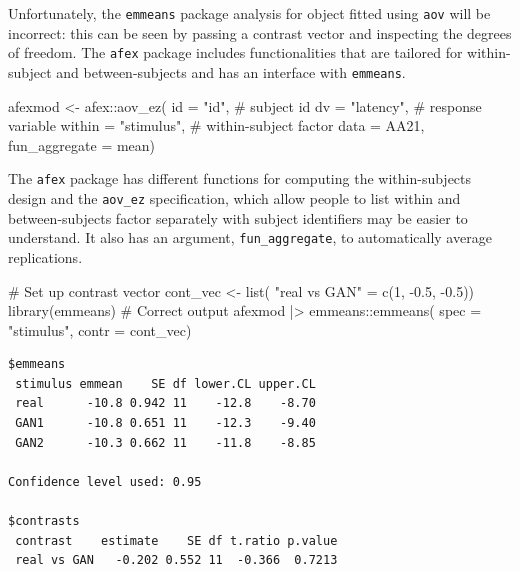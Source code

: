 \documentclass[
  11pt,
  letterpaper,
]{scrbook}
\newenvironment{Shaded}{\begin{snugshade}}{\end{snugshade}}
\newcommand{\AttributeTok}[1]{\textcolor[rgb]{0.40,0.45,0.13}{#1}}
\newcommand{\CommentTok}[1]{\textcolor[rgb]{0.37,0.37,0.37}{#1}}
\newcommand{\DecValTok}[1]{\textcolor[rgb]{0.68,0.00,0.00}{#1}}
\newcommand{\FloatTok}[1]{\textcolor[rgb]{0.68,0.00,0.00}{#1}}
\newcommand{\FunctionTok}[1]{\textcolor[rgb]{0.28,0.35,0.67}{#1}}
\newcommand{\NormalTok}[1]{\textcolor[rgb]{0.00,0.23,0.31}{#1}}
\newcommand{\OtherTok}[1]{\textcolor[rgb]{0.00,0.23,0.31}{#1}}
\newcommand{\SpecialCharTok}[1]{\textcolor[rgb]{0.37,0.37,0.37}{#1}}
\newcommand{\StringTok}[1]{\textcolor[rgb]{0.13,0.47,0.30}{#1}}
\theoremstyle{definition}
\theoremstyle{definition}
\theoremstyle{remark}
\begin{document}
Unfortunately, the \texttt{emmeans} package analysis for object fitted
using \texttt{aov} will be incorrect: this can be seen by passing a
contrast vector and inspecting the degrees of freedom. The \texttt{afex}
package includes functionalities that are tailored for within-subject
and between-subjects and has an interface with \texttt{emmeans}.

\begin{Shaded}
\begin{Highlighting}[]
\NormalTok{afexmod }\OtherTok{\textless{}{-}}\NormalTok{ afex}\SpecialCharTok{::}\FunctionTok{aov\_ez}\NormalTok{(}
  \AttributeTok{id =} \StringTok{"id"}\NormalTok{,           }\CommentTok{\# subject id}
  \AttributeTok{dv =} \StringTok{"latency"}\NormalTok{,      }\CommentTok{\# response variable}
  \AttributeTok{within =} \StringTok{"stimulus"}\NormalTok{, }\CommentTok{\# within{-}subject factor}
  \AttributeTok{data =}\NormalTok{ AA21,}
  \AttributeTok{fun\_aggregate =}\NormalTok{ mean)}
\end{Highlighting}
\end{Shaded}

The \texttt{afex} package has different functions for computing the
within-subjects design and the \texttt{aov\_ez} specification, which
allow people to list within and between-subjects factor separately with
subject identifiers may be easier to understand. It also has an
argument, \texttt{fun\_aggregate}, to automatically average
replications.

\begin{Shaded}
\begin{Highlighting}[]
\CommentTok{\# Set up contrast vector}
\NormalTok{cont\_vec }\OtherTok{\textless{}{-}} \FunctionTok{list}\NormalTok{(}
  \StringTok{"real vs GAN"} \OtherTok{=} \FunctionTok{c}\NormalTok{(}\DecValTok{1}\NormalTok{, }\SpecialCharTok{{-}}\FloatTok{0.5}\NormalTok{, }\SpecialCharTok{{-}}\FloatTok{0.5}\NormalTok{))}
\FunctionTok{library}\NormalTok{(emmeans)}
\CommentTok{\# Correct output}
\NormalTok{afexmod }\SpecialCharTok{|\textgreater{}}
\NormalTok{  emmeans}\SpecialCharTok{::}\FunctionTok{emmeans}\NormalTok{(}
    \AttributeTok{spec =} \StringTok{"stimulus"}\NormalTok{, }
    \AttributeTok{contr =}\NormalTok{ cont\_vec)}
\end{Highlighting}
\end{Shaded}

\begin{verbatim}
$emmeans
 stimulus emmean    SE df lower.CL upper.CL
 real      -10.8 0.942 11    -12.8    -8.70
 GAN1      -10.8 0.651 11    -12.3    -9.40
 GAN2      -10.3 0.662 11    -11.8    -8.85

Confidence level used: 0.95 

$contrasts
 contrast    estimate    SE df t.ratio p.value
 real vs GAN   -0.202 0.552 11  -0.366  0.7213
\end{verbatim}
\end{document}
